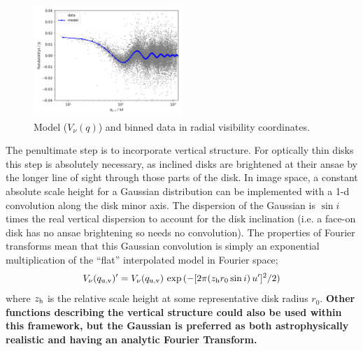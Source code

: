 \documentclass[fleqn,usenatbib]{mnras}
\begin{document}

\begin{figure}
    \centering
    \hspace{-0.5cm}\includegraphics[width=0.5\textwidth]{model.png}
    \caption{Model ($V_\nu(q)$) and binned data in radial visibility coordinates.}
    \label{fig:model}
\end{figure}

The penultimate step is to incorporate vertical structure. For optically thin disks this step is absolutely necessary, as inclined disks are brightened at their ansae by the longer line of sight through those parts of the disk. In image space, a constant absolute scale height for a Gaussian distribution can be implemented with a 1-d convolution along the disk minor axis. The dispersion of the Gaussian is $\sin i$ times the real vertical dispersion to account for the disk inclination (i.e. a face-on disk has no ansae brightening so needs no convolution). The properties of Fourier transforms mean that this Gaussian convolution is simply an exponential multiplication of the ``flat'' interpolated model in Fourier space;
\begin{equation}\label{eq:vert}
    V_\nu(q_{\rm u,v})' = V_\nu(q_{\rm u,v}) \, \exp{(-[2 \pi (z_{\rm h} r_0 \sin i) \, u']^2/2)}
\end{equation}
where $z_{\rm h}$ is the relative scale height at some representative disk radius $r_0$. \textbf{Other functions describing the vertical structure could also be used within this framework, but the Gaussian is preferred as both astrophysically realistic \citep[e.g.][]{2019AJ....157..135M} and having an analytic Fourier Transform.}
\end{document}
